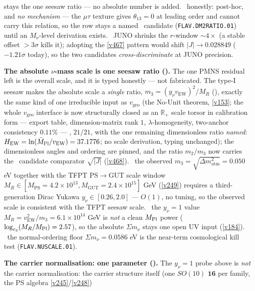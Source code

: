 stays the one seesaw ratio --- no absolute number is added. \mO\ honestly: post-hoc, and \emph{no mechanism} --- the
$\mu\tau$ texture gives $\theta_{13}=0$ at leading order and cannot carry this relation, so the row stays a named
\mO\ candidate (\texttt{FLAV.DM2RATIO.01}) until an $M_\nu$-level derivation exists. \mX\ JUNO shrinks the
$r$-window ${\sim}4\times$ (a stable offset $>3\sigma$ kills it); adopting the \vref{v467} pattern would shift
$|J|\to0.028849$ ($-1.21\sigma$ today), so the two candidates \emph{cross-discriminate} at JUNO precision.
\par\smallskip\noindent\textbf{The absolute $\nu$-mass scale is one seesaw ratio ().}
The one PMNS residual left is the overall scale, and it is typed honestly --- not fabricated. The type-I seesaw
makes the absolute scale a \emph{single} ratio, $m_3=(y_\nu v_{\mathrm{EW}})^2/M_R$ (\mE), exactly the same kind of
one irreducible input as $v_{\mathrm{geo}}$ (the No-Unit theorem, \vref{v153}; the whole $v_{\mathrm{geo}}$
interface is now structurally closed as an $\mathbb R_+$ scale torsor in calibration form ---
export table, dimension-matrix rank $1$, $\lambda$-homogeneity, two-anchor consistency $0.11\%$ ---
, $21/21$, with the one remaining dimensionless ratio
\emph{named}: $H_{\mathrm{EW}}=\ln(\bar M_{\mathrm{Pl}}/v_{\mathrm{EW}})=37.1776$; no scale derivation, typing
unchanged); the dimensionless angles and ordering
are pinned, and the ratio $m_2/m_3$ now carries the \mO\ candidate comparator $\sqrt{|J|}$ (\vref{v468}). \mC\ the observed $m_3=\sqrt{\Delta m^2_{\mathrm{atm}}}
=0.050$ eV together with the TFPT PS$\to$GUT scale window $M_R\in[M_{\mathrm{PS}}{=}4.2{\times}10^{13},
M_{\mathrm{GUT}}{=}2.4{\times}10^{15}]$ GeV (\vref{v249}) requires a third-generation Dirac Yukawa
$y_\nu\in[0.26,2.0]$ --- $O(1)$, no tuning, so the observed scale is consistent with the TFPT seesaw scale.
\mO\ the $y_\nu{=}1$ value $M_R=v_{\mathrm{EW}}^2/m_3=6.1{\times}10^{14}$ GeV is \emph{not} a clean $M_{\mathrm{Pl}}$ power
($\log_{c_3}(M_R/M_{\mathrm{Pl}})=2.57$), so the absolute $\Sigma m_\nu$ stays one open UV input (\vref{v184}). \mX\ the
normal-ordering floor $\Sigma m_\nu=0.0586$ eV is the near-term cosmological kill test (\texttt{FLAV.NUSCALE.01}).
\par\smallskip\noindent\textbf{The carrier normalisation: one parameter
().} The $y_\nu{=}1$ probe above is \emph{not} the carrier normalisation:
the carrier structure itself (one $SO(10)$ $\mathbf{16}$ per family, the PS algebra \vref{v245}/\vref{v248})
